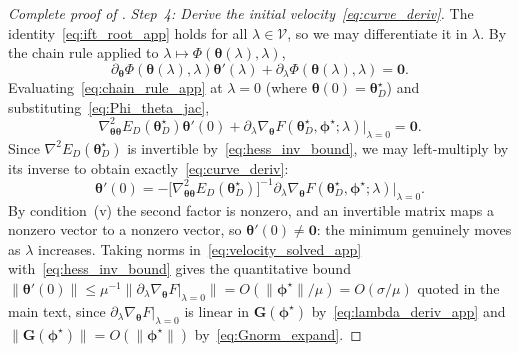 \documentclass[11pt]{article}
\newcommand{\cV}{\mathcal{V}}
\theoremstyle{plain}
\theoremstyle{plain}
\begin{document}
\begin{proof}[Complete proof of ]
\emph{Step~4: Derive the initial velocity~\eqref{eq:curve_deriv}.}
The identity~\eqref{eq:ift_root_app} holds for all $\lambda\in\cV$, so
we may differentiate it in $\lambda$.  By the chain rule applied to
$\lambda\mapsto\Phi(\bm\theta(\lambda),\lambda)$,
\begin{equation}\label{eq:chain_rule_app}
  \partial_{\bm\theta}\Phi(\bm\theta(\lambda),\lambda) \bm\theta'(\lambda)
  +\partial_\lambda\Phi(\bm\theta(\lambda),\lambda)=\bm0 .
\end{equation}
Evaluating~\eqref{eq:chain_rule_app} at $\lambda=0$ (where
$\bm\theta(0)=\bm\theta_D^\star$) and
substituting~\eqref{eq:Phi_theta_jac},
\begin{equation}\label{eq:velocity_eqn_app}
  \nabla^2_{\bm\theta\bm\theta}E_D(\bm\theta_D^\star) \bm\theta'(0)
  +\partial_\lambda\nabla_{\bm\theta}
   F(\bm\theta_D^\star,\bm\phi^\star;\lambda)\big|_{\lambda=0}=\bm0 .
\end{equation}
Since $\nabla^2 E_D(\bm\theta_D^\star)$ is invertible
by~\eqref{eq:hess_inv_bound}, we may left-multiply
by its inverse to obtain exactly~\eqref{eq:curve_deriv}:
\begin{equation}\label{eq:velocity_solved_app}
  \bm\theta'(0)
  =-\bigl[\nabla^2_{\bm\theta\bm\theta}E_D(\bm\theta_D^\star)\bigr]^{-1}
     \partial_\lambda\nabla_{\bm\theta}
     F(\bm\theta_D^\star,\bm\phi^\star;\lambda)\big|_{\lambda=0} .
\end{equation}
By condition~(v) the second factor is nonzero, and an invertible matrix
maps a nonzero vector to a nonzero vector, so $\bm\theta'(0)\neq\bm0$:
the minimum genuinely moves as $\lambda$ increases.  Taking norms
in~\eqref{eq:velocity_solved_app} with~\eqref{eq:hess_inv_bound} gives
the quantitative bound
$\|\bm\theta'(0)\|\le\mu^{-1} 
\|\partial_\lambda\nabla_{\bm\theta}F|_{\lambda=0}\|
=O(\|\bm\phi^\star\|/\mu)=O(\sigma/\mu)$ quoted in the main text, since
$\partial_\lambda\nabla_{\bm\theta}F|_{\lambda=0}$ is linear in
$\mathbf{G}(\bm\phi^\star)$ by~\eqref{eq:lambda_deriv_app} and
$\|\mathbf{G}(\bm\phi^\star)\|=O(\|\bm\phi^\star\|)$
by~\eqref{eq:Gnorm_expand}.


\end{proof}
\end{document}
